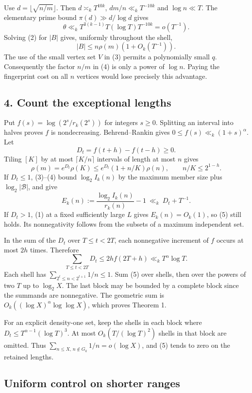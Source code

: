 \documentclass[10pt]{article}
\begin{document}
Use \(d=\lfloor\sqrt{n/m}\rfloor\). Then \(d\asymp_k T^{10k}\), \(dm/n\ll_k T^{-10k}\) and \(\log n\ll T\). The elementary prime bound \(\pi(d)\gg d/\log d\) gives \[
\theta\ll_k T^{3(k-1)} T(\log T)T^{-10k}=o(T^{-1}).
\] Solving (2) for \(|B|\) gives, uniformly throughout the shell, \[
|B|\le n\rho(m)(1+O_k(T^{-1})). \tag{4}
\] The use of the small vertex set \(V\) in (3) permits a polynomially small \(q\). Consequently the factor \(n/m\) in (4) is only a power of \(\log n\). Paying the fingerprint cost on all \(n\) vertices would lose precisely this advantage.

\subsection{4. Count the exceptional lengths}\label{count-the-exceptional-lengths}

Put \(f(s)=\log(2^s/r_k(2^s))\) for integers \(s\ge0\). Splitting an interval into halves proves \(f\) is nondecreasing. Behrend--Rankin gives \(0\le f(s)\ll_k (1+s)^\alpha\). Let \[
D_t=f(t+h)-f(t-h)\ge0.
\] Tiling \([K]\) by at most \(\lceil K/n\rceil\) intervals of length at most \(n\) gives \[
\rho(m)=e^{D_t}\rho(K)\le e^{D_t}(1+n/K)\rho(n),
\qquad n/K\le 2^{1-h}.
\] If \(D_t\le1\), (3)--(4) bound \(\log_2 I_k(n)\) by the maximum member size plus \(\log_2|\mathcal B|\), and give \[
E_k(n):=\frac{\log_2 I_k(n)}{r_k(n)}-1\ \ll_k\ D_t+T^{-1}. \tag{5}
\] If \(D_t>1\), (1) at a fixed sufficiently large \(L\) gives \(E_k(n)=O_k(1)\), so (5) still holds. Its nonnegativity follows from the subsets of a maximum independent set.

In the sum of the \(D_t\) over \(T\le t<2T\), each nonnegative increment of \(f\) occurs at most \(2h\) times. Therefore \[
\sum_{T\le t<2T}D_t\le 2h f(2T+h)\ll_k T^\alpha\log T.
\] Each shell has \(\sum_{2^t\le n<2^{t+1}}1/n\le1\). Sum (5) over shells, then over the powers of two \(T\) up to \(\log_2 X\). The last block may be bounded by a complete block since the summands are nonnegative. The geometric sum is \(O_k((\log X)^\alpha\log\log X)\), which proves Theorem 1.

For an explicit density-one set, keep the shells in each block where \(D_t\le T^{\alpha-1}(\log T)^3\). At most \(O_k(T/(\log T)^2)\) shells in that block are omitted. Thus \(\sum_{n\le X,\,n\notin G_k}1/n=o(\log X)\), and (5) tends to zero on the retained lengths.

\subsection{Uniform control on shorter ranges}\label{uniform-control-on-shorter-ranges}
\end{document}
